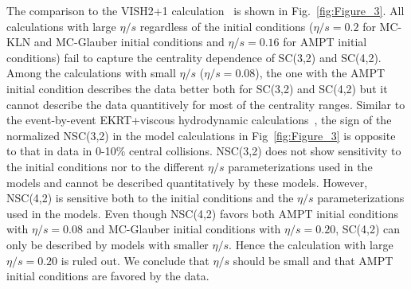 The comparison to the VISH2+1 calculation~\cite{Zhu:2016puf} is shown in Fig.~\ref{fig:Figure_3}.  All calculations with large $\eta/s$ regardless of the initial conditions ($\eta/s=0.2$ for MC-KLN and MC-Glauber initial conditions and $\eta/s=0.16$ for AMPT initial conditions) fail to capture the centrality dependence of SC(3,2) and SC(4,2). 
Among the calculations with small $\eta/s$ ($\eta/s=0.08$), the one with the AMPT initial condition describes the data better both for SC(3,2) and SC(4,2) but it cannot describe the data quantitively for most of the centrality ranges.
Similar to the event-by-event EKRT+viscous hydrodynamic calculations~\cite{Niemi:2015qia}, the sign of the normalized NSC(3,2) in the model calculations in Fig~\ref{fig:Figure_3} is opposite to that in data in 0-10\% central collisions. NSC(3,2) does not show sensitivity to the initial conditions nor to the different $\eta/s$ parameterizations used in the models and cannot be described quantitatively by these models.
However, NSC(4,2) is sensitive both to the initial conditions and the $\eta/s$ parameterizations used in the models.
Even though NSC(4,2) favors both AMPT initial conditions with $\eta/s=0.08$ and MC-Glauber initial conditions with $\eta/s=0.20$,
SC(4,2) can only be described by models with smaller $\eta/s$. Hence the calculation with large $\eta/s=0.20$ is ruled out. We conclude that $\eta/s$ should be small and that AMPT initial conditions are favored by the data.

